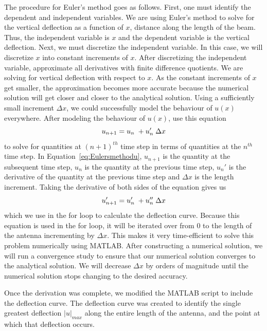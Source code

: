 \documentclass[12pt]{article}
\begin{document}
The procedure for Euler’s method goes as follows. First, one must identify the dependent and independent variables. We are using Euler’s method to solve for the vertical deflection as a function of $x$, distance along the length of the beam. Thus, the independent variable is $x$ and the dependent variable is the vertical deflection. Next, we must discretize the independent variable. In this case, we will discretize $x$ into constant increments of $x$. After discretizing the independent variable, approximate all derivatives with finite difference quotients. We are solving for vertical deflection with respect to $x$. As the constant increments of $x$ get smaller, the approximation becomes more accurate because the numerical solution will get closer and closer to the analytical solution. Using a sufficiently small increment $\Delta{x}$, we could successfully model the behaviour of $u(x)$ everywhere. After modeling the behaviour of $u(x)$, use this equation 
\begin{equation}\label{eq:Eulersmethodu}
    \centering
    u_{n+1} = {u_n}\;+u_n'\; \Delta{x}
\end{equation}
to solve for quantities at $(n+1)^{th}$ time step in terms of quantities at the $n^{th}$ time step. In Equation~\eqref{eq:Eulersmethodu}, $u_{n+1}$ is the quantity at the subsequent time step, $u_n$ is the quantity at the previous time step, $u_n'$ is the derivative of the quantity at the previous time step and $\Delta{x}$ is the length increment. Taking the derivative of both sides of the equation gives us
\begin{equation}
    \centering
    u_{n+1}' = u_n'\;+u_n''\; \Delta{x}
\end{equation}
which we use in the for loop to calculate the deflection curve. Because this equation is used in the for loop, it will be iterated over from 0 to the length of the antenna incrementing by $\Delta{x}$. This makes it very time-efficient to solve this problem numerically using MATLAB. After constructing a numerical solution, we will run a convergence study to ensure that our numerical solution converges to the analytical solution. We will decrease $\Delta{x}$ by orders of magnitude until the numerical solution stops changing to the desired accuracy.

Once the derivation was complete, we modified the MATLAB script to include the deflection curve. The deflection curve was created to identify the single greatest deflection $|u|_{max}$ along the entire length of the antenna, and the point at which that deflection occurs. 
\end{document}
